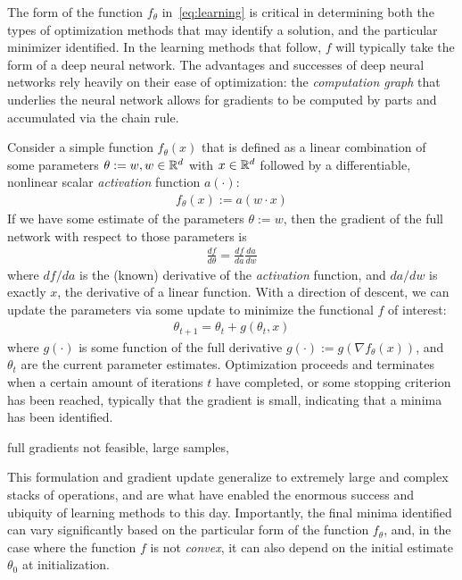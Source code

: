 The form of the function $f_\theta$ in~\eqref{eq:learning}
is critical in determining both
the types of optimization methods
that may identify a solution,
and the particular minimizer identified.
In the learning methods that follow,
$f$ will typically take the form of 
a deep neural network.
The advantages
and successes of deep neural networks
rely heavily on their ease of optimization:
the \textit{computation graph} that 
underlies the neural network
allows for gradients
to be computed by parts
and accumulated via the chain rule.

Consider a simple function $f_\theta(x)$
that is defined as a linear combination of 
some parameters $\theta:=w, w\in \mathbb{R}^d$ with $x\in \mathbb{R}^d$ followed by 
a differentiable, nonlinear scalar \textit{activation} function $a(\cdot)$:
\begin{align}
	f_\theta(x) := a(w\cdot x)
\end{align}
If we have some estimate of the parameters $\theta:=w$,
then the gradient of the full network with respect to those parameters is
\begin{align}
	\frac{df}{d\theta} = \frac{df}{da}\frac{da}{dw}
\end{align}
where $df/da$ is the (known) derivative of the \textit{activation} function,
and $da/dw$ is exactly $x$, the derivative of a linear function.
With a direction of descent,
we can update the parameters via some update to minimize the functional $f$ of interest:
\begin{align}
	\theta_{t+1} = \theta_t + g(\theta_t,x)
\end{align}
where $g(\cdot)$ is some function of the full derivative $g(\cdot) := g(\nabla f_\theta(x))$,
and $\theta_t$ are the current parameter estimates.
Optimization proceeds and terminates when a certain amount
of iterations $t$ have completed,
or some stopping criterion has been reached,
typically that the gradient is small,
indicating that a minima has been identified.

full gradients not feasible, large samples,


This formulation and gradient update generalize
to extremely large and complex stacks
of operations, and are what have enabled
the enormous success and ubiquity of learning
methods to this day.
Importantly,
the final minima identified can 
vary significantly based on the particular form 
of the function $f_\theta$, and,
in the case where the function $f$ is
not \textit{convex},
it can also depend on
the initial estimate $\theta_0$ at initialization.


